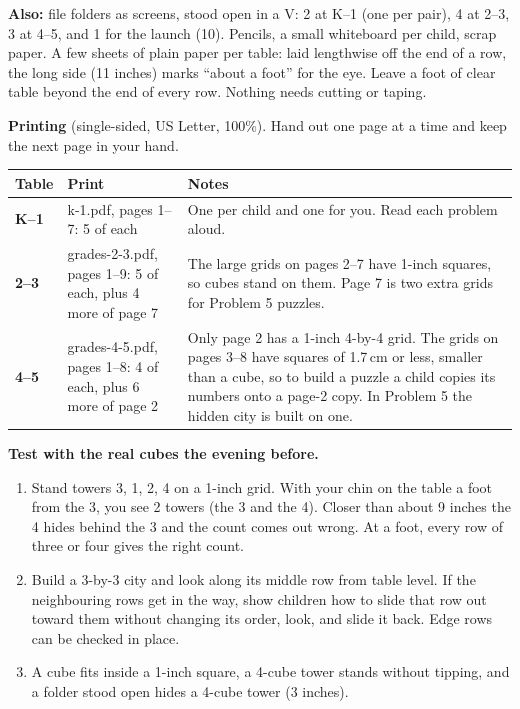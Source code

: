 \documentclass[11pt]{extarticle}
\begin{document}
\textbf{Also:} file folders as screens, stood open in a V: 2 at K--1 (one per pair), 4 at 2--3, 3 at 4--5, and 1 for the launch (10). Pencils, a small whiteboard per child, scrap paper. A few sheets of plain paper per table: laid lengthwise off the end of a row, the long side (11 inches) marks ``about a foot'' for the eye. Leave a foot of clear table beyond the end of every row. Nothing needs cutting or taping.

\textbf{Printing} (single-sided, US Letter, 100\%). Hand out one page at a time and keep the next page in your hand.

\begin{xltabular}{\linewidth}{@{}>{\bfseries}l p{5.4cm} X@{}}
\toprule
Table & Print & Notes \\
\midrule
\endhead
K--1 & k-1.pdf, pages 1--7: 5 of each & One per child and one for you. Read each problem aloud. \\
2--3 & grades-2-3.pdf, pages 1--9: 5 of each, plus 4 more of page 7 & The large grids on pages 2--7 have 1-inch squares, so cubes stand on them. Page 7 is two extra grids for Problem 5 puzzles. \\
4--5 & grades-4-5.pdf, pages 1--8: 4 of each, plus 6 more of page 2 & Only page 2 has a 1-inch 4-by-4 grid. The grids on pages 3--8 have squares of 1.7\,cm or less, smaller than a cube, so to build a puzzle a child copies its numbers onto a page-2 copy. In Problem 5 the hidden city is built on one. \\
\bottomrule
\end{xltabular}

\textbf{Test with the real cubes the evening before.}
\begin{enumerate}
\item Stand towers 3, 1, 2, 4 on a 1-inch grid. With your chin on the table a foot from the 3, you see 2 towers (the 3 and the 4). Closer than about 9 inches the 4 hides behind the 3 and the count comes out wrong. At a foot, every row of three or four gives the right count.
\item Build a 3-by-3 city and look along its middle row from table level. If the neighbouring rows get in the way, show children how to slide that row out toward them without changing its order, look, and slide it back. Edge rows can be checked in place.
\item A cube fits inside a 1-inch square, a 4-cube tower stands without tipping, and a folder stood open hides a 4-cube tower (3 inches).
\end{enumerate}
\end{document}
